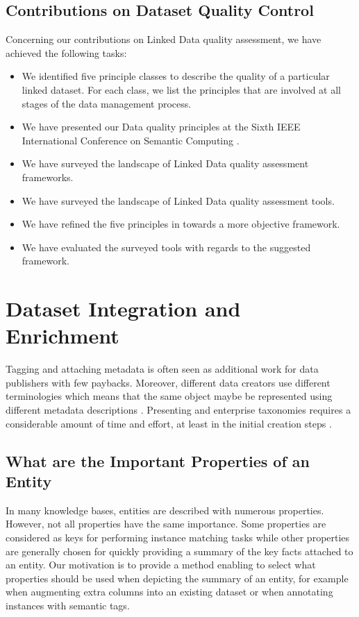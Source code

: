 \documentclass[onecolumn, crcready]{iosart2c}
\begin{document}
\subsection{Contributions on Dataset Quality Control}
Concerning our contributions on Linked Data quality assessment, we have achieved the following tasks:
\begin{itemize}
\item We identified five principle classes to describe the quality of a particular linked dataset. For each class, we list the principles that are involved at all stages of the data management process.
\item We have presented our Data quality principles at the Sixth IEEE International Conference on Semantic Computing \cite{assaf2012}.
\item We have surveyed the landscape of Linked Data quality assessment frameworks.
\item We have surveyed the landscape of Linked Data quality assessment tools.
\item We have refined the five principles in \cite{assaf2012} towards a more objective framework.
\item We have evaluated the surveyed tools with regards to the suggested framework.
\end{itemize}


\section{Dataset Integration and Enrichment}
Tagging and attaching metadata is often seen as additional work for data publishers with few paybacks. Moreover, different data creators use different terminologies which means that the same object maybe be represented using different metadata descriptions \cite{Furnas87thevocabulary}. Presenting and enterprise taxonomies requires a considerable amount of time and effort, at least in the initial creation steps \cite{frischmuth2012linked}.\\

\subsection{What are the Important Properties of an Entity}
In many knowledge bases, entities are described with numerous properties. However, not all properties have the same importance. Some properties are considered as keys for performing instance matching tasks while other properties are generally chosen for quickly providing a summary of the key facts attached to an entity. Our motivation is to provide a method enabling to select what properties should be used when depicting the summary of an entity, for example when augmenting extra columns into an existing dataset or when annotating instances with semantic tags.
\end{document}
